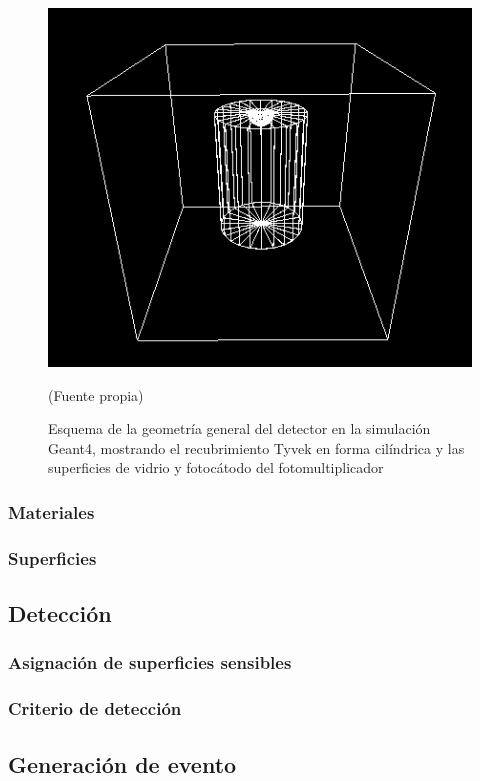 \documentclass{book}
\begin{document}
\begin{figure}[ht] %
\begin{center}
 \includegraphics[width = 0.8\linewidth]{GeometriaG4.png}
 
(Fuente propia)
\caption{Esquema de la geometr\'ia general del detector en la simulaci\'on Geant4, mostrando el recubrimiento Tyvek en forma cil\'indrica y las superficies de vidrio y fotoc\'atodo del fotomultiplicador}
\end{center}
\end{figure}

\subsubsection{Materiales}
\subsubsection{Superficies}

\subsection{Detecci\'on}
\subsubsection{Asignaci\'on de superficies sensibles}
\subsubsection{Criterio de detecci\'on}

\subsection{Generaci\'on de evento}
\end{document}
